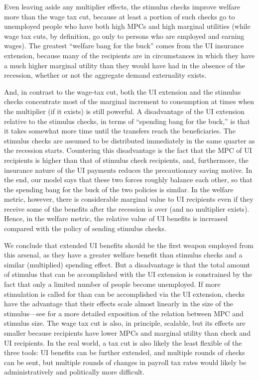\documentclass[\econtexRoot/HAFiscal]{subfiles}
\begin{document}
Even leaving aside any multiplier effects, the stimulus checks improve welfare more than the wage tax cut, because at least a portion of such checks go to unemployed people who have both high MPCs and high marginal utilities (while wage tax cuts, by definition, go only to persons who are employed and earning wages). The greatest ``welfare bang for the buck'' comes from the UI insurance extension, because many of the recipients are in circumstances in which they have a much higher marginal utility than they would have had in the absence of the recession, whether or not the aggregate demand externality exists.

And, in contrast to the wage-tax cut, both the UI extension and the stimulus checks concentrate most of the marginal increment to consumption at times when the multiplier (if it exists) is still powerful.  A disadvantage of the UI extension relative to the stimulus checks, in terms of ``spending bang for the buck,'' is that it takes somewhat more time until the transfers reach the beneficiaries. The stimulus checks are assumed to be distributed immediately in the same quarter as the recession starts. Countering this disadvantage is the fact that the MPC of UI recipients is higher than that of stimulus check recipients, and, furthermore, the insurance nature of the UI payments reduces the precautionary saving motive. In the end, our model says that these two forces roughly balance each other, so that the spending bang for the buck of the two policies is similar. In the welfare metric, however, there is considerable marginal value to UI recipients even if they receive some of the benefits after the recession is over (and no multiplier exists). Hence, in the welfare metric, the relative value of UI benefits is increased compared with the policy of sending stimulus checks.

We conclude that extended UI benefits should be the first weapon employed from this arsenal, as they have a greater welfare benefit than stimulus checks and a similar (multiplied) spending effect.  But a disadvantage is that the total amount of stimulus that can be accomplished with the UI extension is constrained by the fact that only a limited number of people become unemployed.  If more stimulation is called for than can be accomplished via the UI extension, checks have the advantage that their effects scale almost linearly in the size of the stimulus---see \cite{beraja2023size} for a more detailed exposition of the relation between MPC and stimulus size.  The wage tax cut is also, in principle, scalable, but its effects are smaller because recipients have lower MPCs and marginal utility than check and UI recipients.  In the real world, a tax cut is also likely the least flexible of the three tools:  UI benefits can be further extended, and multiple rounds of checks can be sent, but multiple rounds of changes in payroll tax rates would likely be administratively and politically more difficult.
\end{document}
